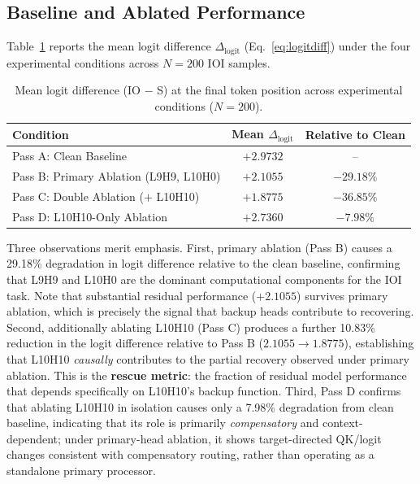\documentclass[12pt,a4paper]{article}
\begin{document}
\subsection{Baseline and Ablated Performance}
\label{subsec:baselines}

Table~\ref{tab:logit_diffs} reports the mean logit difference
$\Delta_\text{logit}$ (Eq.~\ref{eq:logitdiff}) under the four experimental
conditions across $N=200$ IOI samples.

\begin{table}[!htbp]
  \centering
  \caption{Mean logit difference (IO $-$ S) at the final token position across experimental conditions ($N=200$).}
  \label{tab:logit_diffs}
  \begin{tabular}{lcc}
    \toprule
    \textbf{Condition} & \textbf{Mean $\Delta_\text{logit}$} & \textbf{Relative to Clean} \\
    \midrule
    Pass A: Clean Baseline                  & $+2.9732$ & --            \\
    Pass B: Primary Ablation (L9H9, L10H0)  & $+2.1055$ & $-29.18\%$   \\
    Pass C: Double Ablation ($+$ L10H10)    & $+1.8775$ & $-36.85\%$   \\
    Pass D: L10H10-Only Ablation            & $+2.7360$ & $-7.98\%$    \\
    \bottomrule
  \end{tabular}
\end{table}

Three observations merit emphasis. First, primary ablation (Pass B) causes a
29.18\% degradation in logit difference relative to the clean baseline, confirming
that L9H9 and L10H0 are the dominant computational components for the IOI task.
Note that substantial residual performance ($+2.1055$) survives primary ablation,
which is precisely the signal that backup heads contribute to recovering.
Second, additionally ablating L10H10 (Pass C) produces a further 10.83\% reduction
in the logit difference relative to Pass B ($2.1055 \to 1.8775$), establishing
that L10H10 \emph{causally} contributes to the partial recovery observed under
primary ablation. This is the \textbf{rescue metric}: the fraction of residual
model performance that depends specifically on L10H10's backup function. Third,
Pass D confirms that ablating L10H10 in isolation causes only a 7.98\% degradation
from clean baseline, indicating that its role is primarily \emph{compensatory}
and context-dependent; under primary-head ablation, it shows target-directed QK/logit changes
consistent with compensatory routing, rather than operating as a standalone primary processor.
\end{document}

